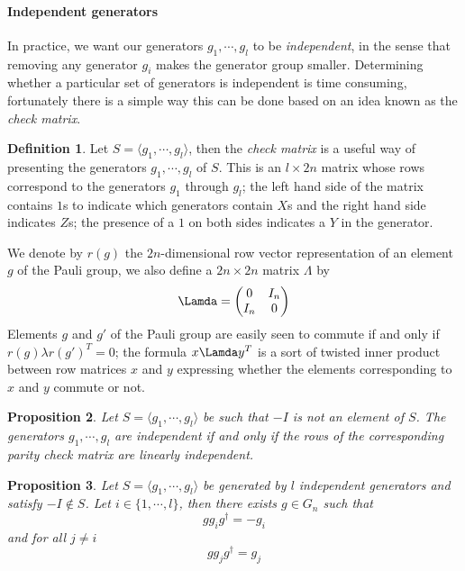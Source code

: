 \documentclass[11pt,a4paper]{article}
\theoremstyle{definition}
\newtheorem{definition}{Definition}[section]
\theoremstyle{plain}
\newtheorem{proposition}[definition]{Proposition}
\theoremstyle{remark}
\begin{document}
\paragraph{Independent generators}
In practice, we want our generators $g_1, \cdots, g_l$ to be \emph{independent}, in the sense that 
removing any generator $g_i$ makes the generator group smaller. 
Determining whether a particular set of generators is independent is time consuming, fortunately 
there is a simple way this can be done based on an idea known as the \emph{check matrix}.

\begin{definition}
    Let $S = \langle g_1, \cdots, g_l \rangle$, then the \emph{check matrix} is a useful way of presenting the 
    generators $g_1, \cdots, g_l$ of $S$. 
    This is an $l \times 2n$ matrix whose rows correspond to the generators $g_1$ through $g_l$; 
    the left hand side of the matrix contains $1$s to indicate which generators contain $X$s and the right hand side 
    indicates $Z$s; the presence of a $1$ on both sides indicates a $Y$ in the generator.
\end{definition}

We denote by $r(g)$ the $2n$-dimensional row vector representation of an element $g$ of the Pauli group, 
we also define a $2n \times 2n$ matrix $\Lambda$ by 
$$ \Lamda = \begin{pmatrix}
    0 & I_n \\
    I_n & 0
\end{pmatrix}$$ 
Elements $g$ and $g'$ of the Pauli group are easily seen to commute if and only if $r(g) \lambda r(g')^T = 0$; 
the formula $x \Lamda y^T$ is a sort of twisted inner product between row matrices $x$ and $y$ expressing whether the elements 
corresponding to $x$ and $y$ commute or not. 

\begin{proposition}
    Let $S = \langle g_1, \cdots, g_l\rangle$ be such that $-I$ is not an element of $S$. 
    The generators $g_1, \cdots, g_l$ are independent if and only if the rows of the 
    corresponding parity check matrix are linearly independent. 
\end{proposition}

\begin{proposition}
    Let $S = \langle g_1, \cdots, g_l\rangle$ be generated by $l$ independent generators and satisfy $-I \not\in S$. 
    Let $i \in \{1, \cdots, l\}$, then there exists $g \in G_n$ such that 
    $$g g_i g^\dagger = - g_i$$
    and for all $j \neq i$ 
    $$g g_j g^\dagger = g_j$$
\end{proposition}
\end{document}
